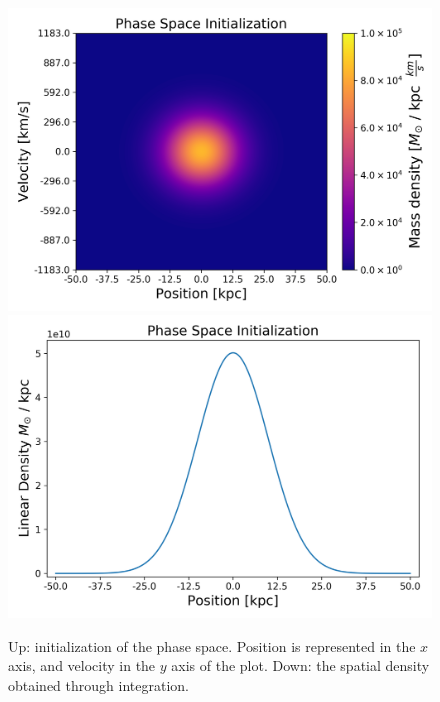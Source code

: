 \begin{figure}[ht!]
    \centering
    \includegraphics[scale=0.6]{imag/1dInitPS.png}
    \includegraphics[scale=0.6]{imag/1dInitDens.png}
    \caption{Up: initialization of the phase space. Position is represented in the $x$ axis, and velocity in the $y$ axis of the plot. Down: the spatial density obtained through integration. }
    \label{1dInit}
\end{figure}
\newpage
